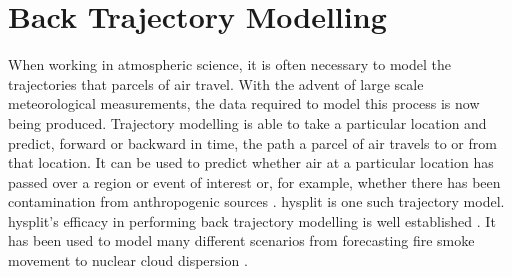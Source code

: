 




	\section{Back Trajectory Modelling}
	\label{sec:backtraj}

	When working in atmospheric science, it is often necessary to model the trajectories that parcels of air travel. With the advent of large scale meteorological measurements, the data required to model this process is now being produced. Trajectory modelling is able to take a particular location and predict, forward or backward in time, the path a parcel of air travels to or from that location. It can be used to predict whether air at a particular location has passed over a region or event of interest or, for example, whether there has been contamination from anthropogenic sources \citep{draxler:1998vr}. \gls{hysplit} is one such trajectory model. \gls{hysplit}'s efficacy in performing back trajectory modelling is well established \citep{draxler:1998vr}. It has been used to model many different scenarios from forecasting fire smoke movement \citep{rolph:2010in} to nuclear cloud dispersion \citep{rolph:2014kk}.



